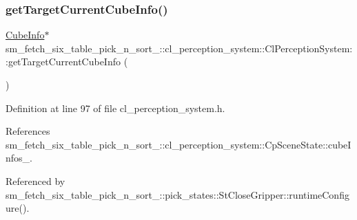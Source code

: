 \subsubsection{\texorpdfstring{get\+Target\+Current\+Cube\+Info()}{getTargetCurrentCubeInfo()}}
{\footnotesize\ttfamily \hyperlink{structsm__fetch__six__table__pick__n__sort__1_1_1cl__perception__system_1_1CubeInfo}{Cube\+Info}$\ast$ sm\+\_\+fetch\+\_\+six\+\_\+table\+\_\+pick\+\_\+n\+\_\+sort\+\_\+::cl\+\_\+perception\+\_\+system\+::\+Cl\+Perception\+System\+::get\+Target\+Current\+Cube\+Info (\begin{DoxyParamCaption}{ }\end{DoxyParamCaption})\hspace{0.3cm}{\ttfamily [inline]}}



Definition at line 97 of file cl\+\_\+perception\+\_\+system.\+h.



References sm\+\_\+fetch\+\_\+six\+\_\+table\+\_\+pick\+\_\+n\+\_\+sort\+\_\+::cl\+\_\+perception\+\_\+system\+::\+Cp\+Scene\+State\+::cube\+Infos\+\_\+.



Referenced by sm\+\_\+fetch\+\_\+six\+\_\+table\+\_\+pick\+\_\+n\+\_\+sort\+\_\+::pick\+\_\+states\+::\+St\+Close\+Gripper\+::runtime\+Configure().



